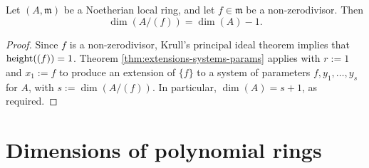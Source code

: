 \documentclass[10pt]{article}
\begin{document}
\begin{corollary}
  Let $(A,\mathfrak{m})$ be a Noetherian local ring,
  and let $f \in \mathfrak{m}$ be a non-zerodivisor.
  Then
  \[
  \dim(A/(f)) = \dim(A) - 1.
  \]
\end{corollary}
\begin{proof}
  Since $f$ is a non-zerodivisor,
  Krull's principal ideal theorem
  implies that $\operatorname{height}((f)) = 1$.
  Theorem \ref{thm:extensions-systems-params}
  applies with $r := 1$ and $x_1 := f$
  to produce an extension of $\{f\}$
  to a system of parameters
  $f,y_1,\dotsc,y_s$ for $A$,
  with $s := \dim(A/(f))$.
  In particular, $\dim(A) = s + 1$, as required.
\end{proof}



\section{Dimensions of polynomial rings}
\label{sec:org80bf51b}
\end{document}
